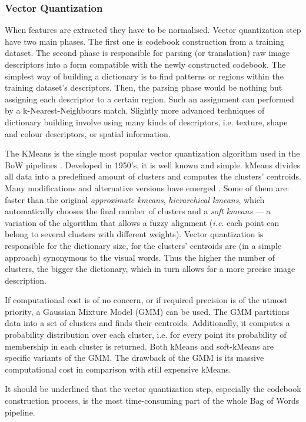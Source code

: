 		\subsubsection{Vector Quantization}
		When features are extracted they have to be normalised. Vector quantization step have two main phases. The first one is codebook construction from a training dataset. The second phase is responsible for parsing (or translation) raw image descriptors into a form compatible with the newly constructed codebook. The simplest way of building a dictionary is to find patterns or regions within the training dataset's descriptors. Then, the parsing phase would be nothing but assigning each descriptor to a certain region. Such an assignment can performed by a k-Nearest-Neighbours match. Slightly more advanced techniques of dictionary building involve using many kinds of descriptors, i.e. texture, shape and colour descriptors, or spatial information.	
		
		The KMeans is the single most popular vector quantization algorithm used in the BoW pipelines \cite{tsai2012bag}. Developed in 1950's, it is well known and simple. kMeans divides all data into a predefined amount of clusters and computes the clusters' centroids. Many modifications and alternative versions have emerged \cite{kmeans_jain2010data}. Some of them are: faster than the original \emph{approximate kmeans}, \emph{hierarchical kmeans}, which automatically chooses the final number of clusters and a  \emph{soft kmeans} --- a variation of the algorithm that allows a fuzzy alignment (\textit{i.e.} each point can belong to several clusters with different weights). Vector quantization is responsible for the dictionary size, for the clusters' centroids are (in a simple approach) synonymous to the visual words. Thus the higher the number of clusters, the bigger the dictionary, which in turn allows for a more precise image description.
		
		If computational cost is of no concern, or if required precision is of the utmost priority, a Gaussian Mixture Model (GMM) can be used. The GMM partitions data into a set of clusters and finds their centroids. Additionally, it computes a probability distribution over each cluster, i.e. for every point its probability of membership in each cluster is returned. Both kMeans and soft-kMeans are specific variants of the GMM. The drawback of the GMM is its massive computational cost in comparison with still expensive kMeans.		
		
		It should be underlined that the vector quantization step, especially the codebook construction process, is the most time-consuming part of the whole Bag of Words pipeline.
	
